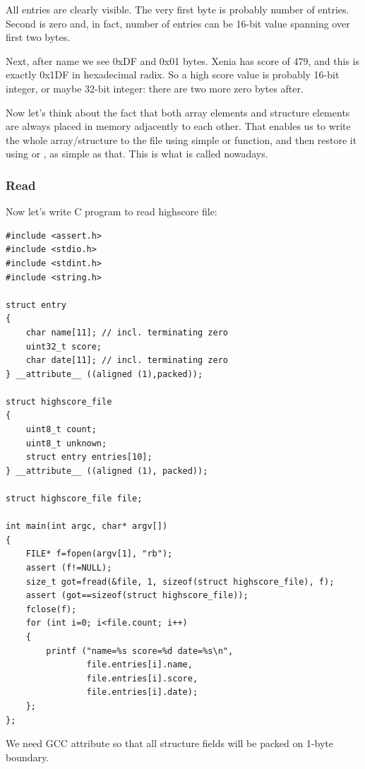 All entries are clearly visible.
The very first byte is probably number of entries.
Second is zero and, in fact, number of entries can be 16-bit value spanning over first two bytes.

Next, after  name we see 0xDF and 0x01 bytes.
Xenia has score of 479, and this is exactly 0x1DF in hexadecimal radix.
So a high score value is probably 16-bit integer, or maybe 32-bit integer: there are two more zero bytes after.

Now let's think about the fact that both array elements and structure elements are always placed in memory adjacently to each other.
That enables us to write the whole array/structure to the file using simple  or  function, 
and then restore it using  or , as simple as that.
This is what is called  nowadays.

\subsubsection{Read}

Now let's write C program to read highscore file:

\begin{lstlisting}[style=customc]
#include <assert.h>
#include <stdio.h>
#include <stdint.h>
#include <string.h>

struct entry
{
	char name[11]; // incl. terminating zero
	uint32_t score;
	char date[11]; // incl. terminating zero
} __attribute__ ((aligned (1),packed));

struct highscore_file
{
	uint8_t count;
	uint8_t unknown;
	struct entry entries[10];
} __attribute__ ((aligned (1), packed));

struct highscore_file file;

int main(int argc, char* argv[])
{
	FILE* f=fopen(argv[1], "rb");
	assert (f!=NULL);
	size_t got=fread(&file, 1, sizeof(struct highscore_file), f);
	assert (got==sizeof(struct highscore_file));
	fclose(f);
	for (int i=0; i<file.count; i++)
	{
		printf ("name=%s score=%d date=%s\n",
				file.entries[i].name,
				file.entries[i].score,
				file.entries[i].date);
	};
};
\end{lstlisting}

We need GCC  attribute so that all structure fields will be packed on 1-byte boundary.

